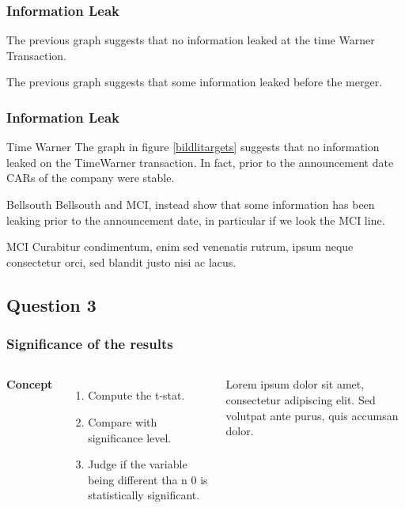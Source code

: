 \documentclass{beamer}
\begin{document}

\begin{frame} %
\frametitle{Information Leak}
\begin{example}
	The previous graph suggests that no information leaked at the time Warner Transaction.
\end{example}
\begin{example}[Bellsouth]
	The previous graph suggests that some information leaked before the merger.
\end{example}
\end{frame}



\begin{frame}
	\frametitle{Information Leak}
	\begin{block}{Time Warner}
	The graph in figure \ref{bildlitargets} suggests that no information leaked on the TimeWarner transaction. In fact, prior to the announcement date CARs of the company were stable. \cite{p1}
	\end{block}
	
	\begin{block}{Bellsouth}
		Bellsouth and MCI, instead
		show that some information has been leaking prior to the announcement date, in particular if
		we look the MCI line.\cite{p2}
	\end{block}
	
	\begin{block}{MCI}
		 Curabitur condimentum, enim sed venenatis rutrum, ipsum neque consectetur orci, sed blandit justo nisi ac lacus. \cite{p1}
	\end{block}
\end{frame}

\subsection{Question 3}
\begin{frame}
	\frametitle{Significance of the results}
	\begin{columns}[c] %
		
		\textbf{Concept}
		\begin{enumerate}
			\item Compute the t-stat.
			\item Compare with significance level.
			\item Judge if the variable being different tha n 0 is statistically significant.\cite{p2}
		\end{enumerate}
		
		Lorem ipsum dolor sit amet, consectetur adipiscing elit. Sed volutpat ante purus, quis accumsan dolor.
		
	\end{columns}
\end{frame}
\end{document}
